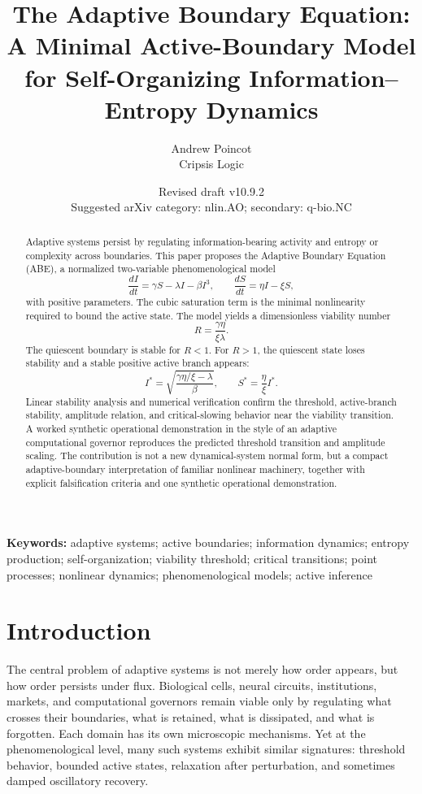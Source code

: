 \documentclass[11pt]{article}
\title{\textbf{The Adaptive Boundary Equation:}\\
A Minimal Active-Boundary Model for Self-Organizing Information--Entropy Dynamics}
\author{Andrew Poincot\\Cripsis Logic}
\date{Revised draft v10.9.2\\Suggested arXiv category: nlin.AO; secondary: q-bio.NC}
\begin{document}
\maketitle

\begin{abstract}
Adaptive systems persist by regulating information-bearing activity and entropy or complexity across boundaries. This paper proposes the Adaptive Boundary Equation (ABE), a normalized two-variable phenomenological model
\begin{equation*}
\frac{dI}{dt}=\gamma S-\lambda I-\beta I^3,\qquad
\frac{dS}{dt}=\eta I-\xi S,
\end{equation*}
with positive parameters. The cubic saturation term is the minimal nonlinearity required to bound the active state. The model yields a dimensionless viability number
\begin{equation*}
R=\frac{\gamma\eta}{\xi\lambda}.
\end{equation*}
The quiescent boundary is stable for $R<1$. For $R>1$, the quiescent state loses stability and a stable positive active branch appears:
\begin{equation*}
I^*=\sqrt{\frac{\gamma\eta/\xi-\lambda}{\beta}},\qquad S^*=\frac{\eta}{\xi}I^*.
\end{equation*}
Linear stability analysis and numerical verification confirm the threshold, active-branch stability, amplitude relation, and critical-slowing behavior near the viability transition. A worked synthetic operational demonstration in the style of an adaptive computational governor reproduces the predicted threshold transition and amplitude scaling. The contribution is not a new dynamical-system normal form, but a compact adaptive-boundary interpretation of familiar nonlinear machinery, together with explicit falsification criteria and one synthetic operational demonstration.
\end{abstract}

\noindent\textbf{Keywords:} adaptive systems; active boundaries; information dynamics; entropy production; self-organization; viability threshold; critical transitions; point processes; nonlinear dynamics; phenomenological models; active inference

\section{Introduction}
The central problem of adaptive systems is not merely how order appears, but how order persists under flux. Biological cells, neural circuits, institutions, markets, and computational governors remain viable only by regulating what crosses their boundaries, what is retained, what is dissipated, and what is forgotten. Each domain has its own microscopic mechanisms. Yet at the phenomenological level, many such systems exhibit similar signatures: threshold behavior, bounded active states, relaxation after perturbation, and sometimes damped oscillatory recovery.
\end{document}
